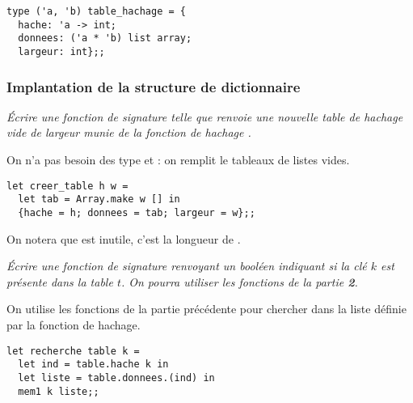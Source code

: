\begin{lstlisting}
type ('a, 'b) table_hachage = {
  hache: 'a -> int;
  donnees: ('a * 'b) list array;
  largeur: int};;
\end{lstlisting}
\subsubsection{Implantation de la structure de dictionnaire}
\begin{Exercise}\it
Écrire une fonction  de signature  telle que 
renvoie une nouvelle table de hachage vide de largeur  munie de
la fonction de hachage .
\end{Exercise}
\begin{Answer}
 On n'a pas besoin des type  et  : on remplit le tableaux de listes vides.
\begin{lstlisting}
let creer_table h w =
  let tab = Array.make w [] in
  {hache = h; donnees = tab; largeur = w};; 
\end{lstlisting}
On notera que  est inutile, c'est la longueur de .
\end{Answer}

\begin{Exercise}\it
Écrire une fonction  de signature  renvoyant un booléen indiquant si la clé
$k$ est présente dans la table $t$. On pourra utiliser les fonctions de
la partie {\bf 2}.
\end{Exercise}
\begin{Answer}
 On utilise les fonctions de la partie précédente pour chercher dans la liste définie par la fonction de hachage.
\begin{lstlisting}
let recherche table k =
  let ind = table.hache k in
  let liste = table.donnees.(ind) in
  mem1 k liste;;
\end{lstlisting}
\end{Answer}

